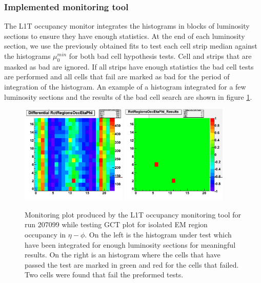 \subsubsection{Implemented monitoring tool}


The \gls{L1T} occupancy monitor integrates the histograms in blocks of luminosity sections to ensure they have enough statistics. At the end of each luminosity section, we use the previously obtained fits to test each cell strip median against the histograms $\mu_0^{min}$ for both bad cell hypothesis tests. Cell and strips that are masked as bad are ignored. If all strips have enough statistics the bad cell tests are performed and all cells that fail are marked as bad for the period of integration of the histogram. An example of a histogram integrated for a few luminosity sections and the results of the bad cell search are shown in figure \ref{FIGURE:TechnicalWork_L1TOccupancyTests}.

\begin{figure}[!htb]
\centering
\includegraphics[width=0.45\textwidth]{Chapter03/L1TOnline/Images/L1TOccupancy_Diff.png}
\includegraphics[width=0.45\textwidth]{Chapter03/L1TOnline/Images/L1TOccupancy_Results.png}
\caption{Monitoring plot produced by the \gls{L1T} occupancy monitoring tool for run 207099 while testing \gls{GCT} plot for isolated \gls{EM} region occupancy in $\eta-\phi$. On the left is the histogram under test which have been integrated for enough luminosity sections for meaningful results. On the right is an histogram where the cells that have passed the test are marked in green and red for the cells that failed. Two cells were found that fail the preformed tests.}
\label{FIGURE:TechnicalWork_L1TOccupancyTests}
\end{figure}

